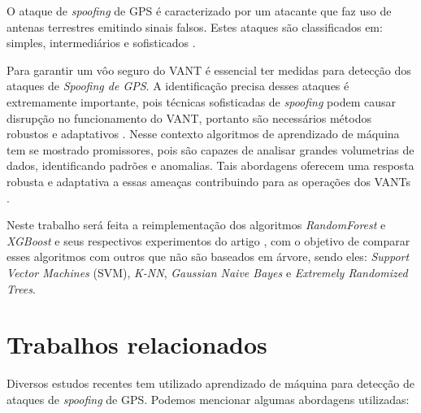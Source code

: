 \documentclass[12pt]{article}
\begin{document}
O ataque de \textit{spoofing} de GPS
é caracterizado por um atacante que faz uso de antenas terrestres
emitindo sinais falsos. \cite{Spoofing}
Estes ataques são classificados em: simples,
intermediários e sofisticados \cite{Aissou2021}.

Para garantir um vôo seguro do VANT é essencial ter medidas
para detecção dos ataques de \textit{Spoofing de GPS}.
A identificação precisa desses ataques é extremamente importante,
pois técnicas sofisticadas de \textit{spoofing}
podem causar disrupção no funcionamento do VANT,
portanto são necessários métodos robustos e adaptativos
\cite{isleyenGPSSpoofingDetection2024}.
Nesse contexto algoritmos de aprendizado
de máquina tem se mostrado promissores,
pois são capazes de analisar grandes volumetrias de dados,
identificando padrões e anomalias.
Tais abordagens oferecem uma resposta robusta e adaptativa
a essas ameaças contribuindo para as operações dos VANTs
\cite{isleyenGPSSpoofingDetection2024}.

Neste trabalho será feita a reimplementação dos algoritmos
\textit{RandomForest} e \textit{XGBoost} e seus respectivos 
experimentos do artigo \cite{Aissou2021}, com o objetivo de comparar
esses algoritmos com outros que não são baseados em árvore,
sendo eles: \textit{Support Vector Machines} (SVM), \textit{K-NN},
\textit{Gaussian Naive Bayes} e \textit{Extremely Randomized Trees}.

\section{Trabalhos relacionados}

Diversos estudos recentes tem utilizado aprendizado de máquina
para detecção de ataques de \textit{spoofing} de GPS.
Podemos mencionar algumas abordagens utilizadas:
\end{document}
